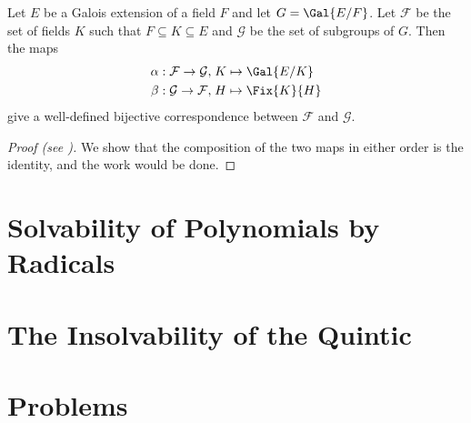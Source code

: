         

\begin{theorem}\label{thrm-fundamental-theorem-of-galois-theory}
    Let $E$ be a Galois extension of a field $F$ and let $G = \Gal{E/F}$. Let $\mathcal{F}$ be the set of fields $K$ such that $F \subseteq K \subseteq E$ and $\mathcal{G}$ be the set of subgroups of $G$. Then the maps
    \begin{align*}
        \alpha: \mathcal{F} \to \mathcal{G}, \;&K \mapsto \Gal{E/K}\\
        \beta: \mathcal{G} \to \mathcal{F}, \;&H \mapsto \Fix{K}{H}
    \end{align*}
    give a well-defined bijective correspondence between $\mathcal{F}$ and $\mathcal{G}$.
\end{theorem}
\begin{proof}[Proof (see {\cite[Theorem 16.7.1]{artin_2011}})]
    We show that the composition of the two maps in either order is the identity, and the work would be done.
\end{proof}

\section{Solvability of Polynomials by Radicals}

\section{The Insolvability of the Quintic}

\newpage

\section{Problems}
